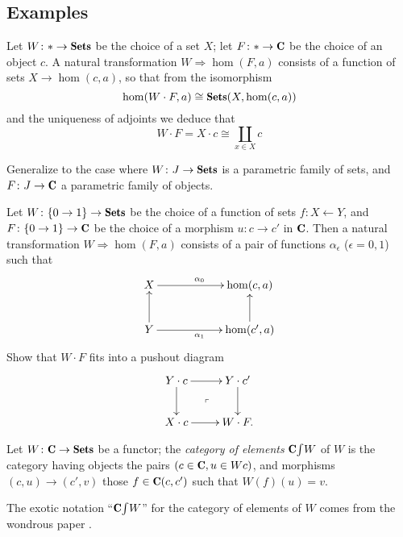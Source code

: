\documentclass[a4paper,12pt]{amsart}
\begin{document}
\subsection{Examples}
\begin{example}
Let $W \colon * \to \Sets$ be the choice of a set $X$; let $F \colon * \to \C$ be the choice of an object $c$. A natural transformation $W\Rightarrow \hom(F,a)$ consists of a function of sets $X \to \hom(c,a)$, so that from the isomorphism
\[
\hom(W\cdot F,a)\cong \Sets(X, \hom(c,a))
\]
and the uniqueness of adjoints we deduce that 
\[\textstyle
W \cdot F = X \cdot c \cong \coprod_{x\in X} c
\]
\end{example}
\begin{exercise}
Generalize to the case where $W \colon J \to \Sets$ is a parametric family of sets, and $F\colon J \to \C$ a parametric family of objects.
\end{exercise}
\begin{example}
Let $W\colon \{0\to 1\}\to \Sets$ be the choice of a function of sets $f : X\leftarrow Y$, and $F\colon \{0\to 1\}\to \C$ be the choice of a morphism $u : c\to c'$ in $\C$. Then a natural transformation $W\Rightarrow \hom(F,a)$ consists of a pair of functions $\alpha_\epsilon$ ($\epsilon=0,1$) such that
\[
\xymatrix@C=2cm{
	X \ar[r]^{\alpha_0}& \hom(c,a)\\
	Y \ar[u]\ar[r]_{\alpha_1}& \hom(c',a)\ar[u]
}
\]
Show that $W\cdot F$ fits into a pushout diagram
\[
\xymatrix{
	Y\cdot c \ar@{}[dr]|\ulcorner \ar[r]\ar[d] & Y\cdot c'\ar[d]\\
	X \cdot c \ar[r] & W\cdot F.
}
\]
\end{example}
\begin{definition}\label{eltsf}
Let $W\colon \C\to \Sets$ be a functor; the \emph{category of elements} $\elts{\C}{W}$ of $W$ is the category having objects the pairs $(c\in\C, u\in Wc)$, and morphisms $(c,u)\to (c',v)$ those $f\in \C(c,c')$ such that $W(f)(u)=v$.
\end{definition}
\begin{notat}
The exotic notation ``$\elts{\C}{W}$'' for the category of elements of $W$ comes from the wondrous paper \cite{Graya}.
\end{notat}
\end{document}
